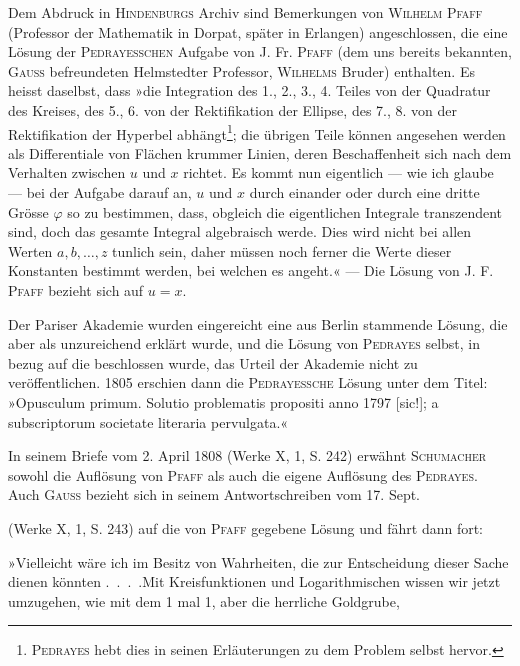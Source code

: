 \par
Dem Abdruck in \textsc{Hindenburgs} Archiv sind Bemerkungen von \textsc{Wilhelm
Pfaff} (Professor der Mathematik in Dorpat, später in Erlangen) angeschlossen,
die eine Lösung der \textsc{Pedrayesschen} Aufgabe von J. Fr. \textsc{Pfaff} (dem uns bereits
bekannten, \textsc{Gauss} befreundeten Helmstedter Professor, \textsc{Wilhelms} Bruder)
enthalten. Es heisst daselbst, dass »die Integration des 1., 2., 3., 4. Teiles
von der Quadratur des Kreises, des 5., 6. von der Rektifikation der Ellipse,
des 7., 8. von der Rektifikation der Hyperbel abhängt\footnote{\textsc{Pedrayes} hebt dies in seinen Erläuterungen zu dem Problem selbst hervor.}; die übrigen Teile
können angesehen werden als Differentiale von Flächen krummer Linien, deren
Beschaffenheit sich nach dem Verhalten zwischen \(u\) und \(x\) richtet. Es kommt
nun eigentlich — wie ich glaube — bei der Aufgabe darauf an, \(u\) und \(x\)
durch einander oder durch eine dritte Grösse \(\varphi\) so zu bestimmen, dass, obgleich
die eigentlichen Integrale transzendent sind, doch das gesamte Integral
algebraisch werde. Dies wird nicht bei allen Werten \(a,b,\ldots,z\) tunlich sein,
daher müssen noch ferner die Werte dieser Konstanten bestimmt werden, bei
welchen es angeht.« — Die Lösung von J. F. \textsc{Pfaff} bezieht sich auf \(u=x\).
\par
Der Pariser Akademie wurden eingereicht eine aus Berlin stammende
Lösung, die aber als unzureichend erklärt wurde, und die Lösung von \textsc{Pedrayes}
selbst, in bezug auf die beschlossen wurde, das Urteil der Akademie
nicht zu veröffentlichen. 1805 erschien dann die \textsc{Pedrayessche} Lösung unter
dem Titel: »Opusculum primum. Solutio problematis propositi anno 1797
[sic!]; a subscriptorum societate literaria pervulgata.«
\par
In seinem Briefe vom 2. April 1808 (Werke X, 1, S. 242) erwähnt \textsc{Schumacher}
sowohl die Auflösung von \textsc{Pfaff} als auch die eigene Auflösung des
\textsc{Pedrayes}. Auch \textsc{Gauss} bezieht sich in seinem Antwortschreiben vom 17. Sept.\par
\clearpage{}
 (Werke X, 1, S. 243) auf die von \textsc{Pfaff} gegebene Lösung und fährt
dann fort:
\par
»Vielleicht wäre ich im Besitz von Wahrheiten, die zur Entscheidung
dieser Sache dienen könnten \mbox{.\ .\ .\ .}\quad Mit Kreisfunktionen und Logarithmischen
wissen wir jetzt umzugehen, wie mit dem 1 mal 1, aber die herrliche Goldgrube,
